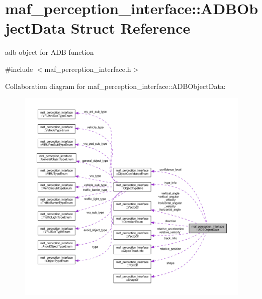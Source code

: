 \hypertarget{structmaf__perception__interface_1_1ADBObjectData}{}\section{maf\+\_\+perception\+\_\+interface\+:\+:A\+D\+B\+Object\+Data Struct Reference}
\label{structmaf__perception__interface_1_1ADBObjectData}


adb object for A\+DB function  




{\ttfamily \#include $<$maf\+\_\+perception\+\_\+interface.\+h$>$}



Collaboration diagram for maf\+\_\+perception\+\_\+interface\+:\+:A\+D\+B\+Object\+Data\+:\nopagebreak
\begin{figure}[H]
\begin{center}
\leavevmode
\includegraphics[width=350pt]{structmaf__perception__interface_1_1ADBObjectData__coll__graph}
\end{center}
\end{figure}
